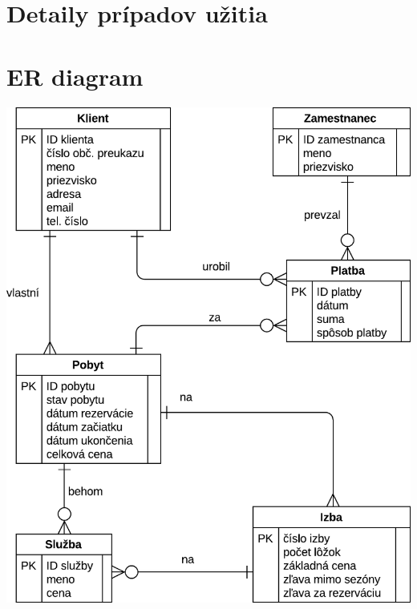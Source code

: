 \documentclass[11pt,a4paper]{article}
\begin{document}
\section*{Detaily prípadov užitia}



\section*{ER diagram}
\vfill
\begin{center}
  \includegraphics[width=0.7\linewidth]{src/er}
\end{center}
\vfill
\end{document}

